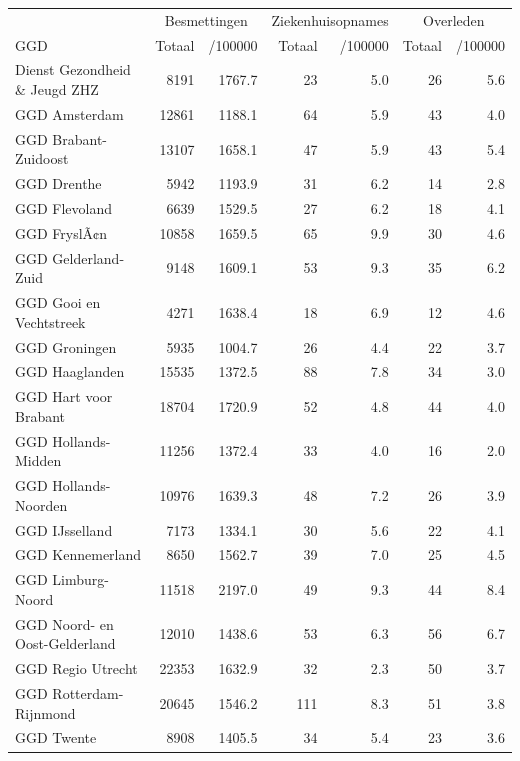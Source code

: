 \documentclass[
  english,
  man,floatsintext]{apa6}
\begin{document}
\begin{table}
\centering\begingroup\fontsize{10}{12}\selectfont

\begin{threeparttable}
\begin{tabular}{lrrrrrr}
\toprule
\multicolumn{1}{c}{ } & \multicolumn{2}{c}{Besmettingen} & \multicolumn{2}{c}{Ziekenhuisopnames} & \multicolumn{2}{c}{Overleden} \\
\cmidrule(l{3pt}r{3pt}){2-3} \cmidrule(l{3pt}r{3pt}){4-5} \cmidrule(l{3pt}r{3pt}){6-7}
GGD & Totaal & /100000 & Totaal & /100000 & Totaal & /100000\\
\midrule
Dienst Gezondheid \& Jeugd ZHZ & 8191 & 1767.7 & 23 & 5.0 & 26 & 5.6\\
GGD Amsterdam & 12861 & 1188.1 & 64 & 5.9 & 43 & 4.0\\
GGD Brabant-Zuidoost & 13107 & 1658.1 & 47 & 5.9 & 43 & 5.4\\
GGD Drenthe & 5942 & 1193.9 & 31 & 6.2 & 14 & 2.8\\
GGD Flevoland & 6639 & 1529.5 & 27 & 6.2 & 18 & 4.1\\
GGD FryslÃ¢n & 10858 & 1659.5 & 65 & 9.9 & 30 & 4.6\\
GGD Gelderland-Zuid & 9148 & 1609.1 & 53 & 9.3 & 35 & 6.2\\
GGD Gooi en Vechtstreek & 4271 & 1638.4 & 18 & 6.9 & 12 & 4.6\\
GGD Groningen & 5935 & 1004.7 & 26 & 4.4 & 22 & 3.7\\
GGD Haaglanden & 15535 & 1372.5 & 88 & 7.8 & 34 & 3.0\\
GGD Hart voor Brabant & 18704 & 1720.9 & 52 & 4.8 & 44 & 4.0\\
GGD Hollands-Midden & 11256 & 1372.4 & 33 & 4.0 & 16 & 2.0\\
GGD Hollands-Noorden & 10976 & 1639.3 & 48 & 7.2 & 26 & 3.9\\
GGD IJsselland & 7173 & 1334.1 & 30 & 5.6 & 22 & 4.1\\
GGD Kennemerland & 8650 & 1562.7 & 39 & 7.0 & 25 & 4.5\\
GGD Limburg-Noord & 11518 & 2197.0 & 49 & 9.3 & 44 & 8.4\\
GGD Noord- en Oost-Gelderland & 12010 & 1438.6 & 53 & 6.3 & 56 & 6.7\\
GGD Regio Utrecht & 22353 & 1632.9 & 32 & 2.3 & 50 & 3.7\\
GGD Rotterdam-Rijnmond & 20645 & 1546.2 & 111 & 8.3 & 51 & 3.8\\
GGD Twente & 8908 & 1405.5 & 34 & 5.4 & 23 & 3.6\\

\end{tabular}
\end{threeparttable}
\end{table}
\end{document}
